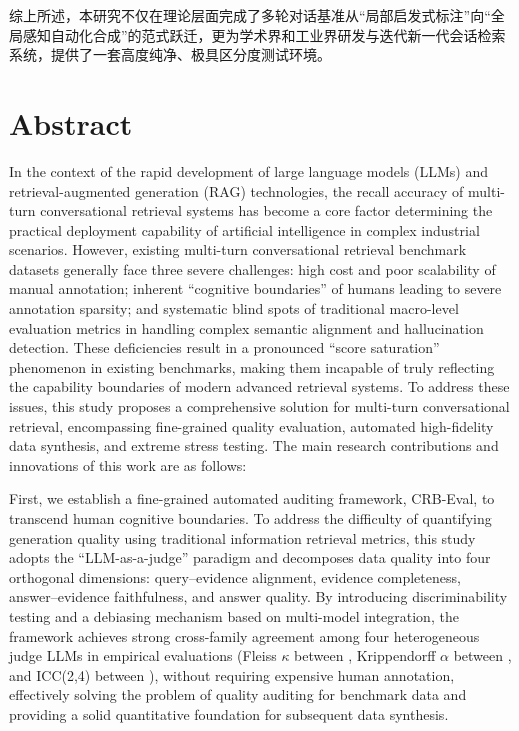 综上所述，本研究不仅在理论层面完成了多轮对话基准从“局部启发式标注”向“全局感知自动化合成”的范式跃迁，更为学术界和工业界研发与迭代新一代会话检索系统，提供了一套高度纯净、极具区分度测试环境。


\chapter{Abstract}%

In the context of the rapid development of large language models (LLMs) and retrieval-augmented generation (RAG) technologies, the recall accuracy of multi-turn conversational retrieval systems has become a core factor determining the practical deployment capability of artificial intelligence in complex industrial scenarios. However, existing multi-turn conversational retrieval benchmark datasets generally face three severe challenges: high cost and poor scalability of manual annotation; inherent “cognitive boundaries” of humans leading to severe annotation sparsity; and systematic blind spots of traditional macro-level evaluation metrics in handling complex semantic alignment and hallucination detection. These deficiencies result in a pronounced “score saturation” phenomenon in existing benchmarks, making them incapable of truly reflecting the capability boundaries of modern advanced retrieval systems. To address these issues, this study proposes a comprehensive solution for multi-turn conversational retrieval, encompassing fine-grained quality evaluation, automated high-fidelity data synthesis, and extreme stress testing. The main research contributions and innovations of this work are as follows:

First, we establish a fine-grained automated auditing framework, CRB-Eval, to transcend human cognitive boundaries. To address the difficulty of quantifying generation quality using traditional information retrieval metrics, this study adopts the “LLM-as-a-judge” paradigm and decomposes data quality into four orthogonal dimensions: query–evidence alignment, evidence completeness, answer–evidence faithfulness, and answer quality. By introducing discriminability testing and a debiasing mechanism based on multi-model integration, the framework achieves strong cross-family agreement among four heterogeneous judge LLMs in empirical evaluations (Fleiss $\kappa$ between , Krippendorff $\alpha$ between , and ICC(2,4) between ), without requiring expensive human annotation, effectively solving the problem of quality auditing for benchmark data and providing a solid quantitative foundation for subsequent data synthesis.

